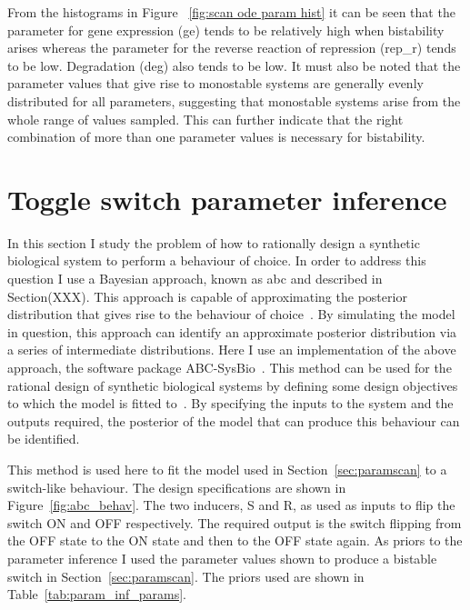 From the histograms in Figure ~\ref{fig:scan ode param hist} it can be seen that the parameter for gene expression (ge) tends to be relatively high when bistability arises whereas the parameter for the reverse reaction of repression (rep\_r) tends to be low. Degradation (deg) also tends to be low. It must also be noted that the parameter values that give rise to monostable systems are generally evenly distributed for all parameters, suggesting that monostable systems arise from the whole range of values sampled. This can further indicate that the right combination of more than one parameter values is necessary for bistability. 



\section{Toggle switch parameter inference}


In this section I study the problem of how to rationally design a synthetic biological system to perform a behaviour of choice.  In order to address this question I use a Bayesian approach, known as \acrlong{abc} and described in Section(XXX). This approach is capable of approximating the posterior distribution that gives rise to the behaviour of choice~\autocite{Toni:2009tr}. By simulating the model in question, this approach can identify an approximate posterior distribution via a series of intermediate distributions. Here I use an implementation of the above approach, the software package ABC-SysBio~\textcite{Liepe:2010eg}. This method can be used for the rational design of synthetic biological systems by defining some design objectives to which the model is fitted to~\textcite{Barnes:2011hh}. By specifying the inputs to the system and the outputs required, the posterior of the model that can produce this behaviour can be identified. 

This method is used here to fit the model used in Section~\ref{sec:paramscan} to a switch-like behaviour. The design specifications are shown in Figure~\ref{fig:abc_behav}. The two inducers, S and R, as used as inputs to flip the switch ON and OFF respectively. The required output is the switch flipping from the OFF state to the ON state and then to the OFF state again. As priors to the parameter inference I used the parameter values shown to produce a bistable switch in Section~\ref{sec:paramscan}. The priors used are shown in Table~\ref{tab:param_inf_params}.

